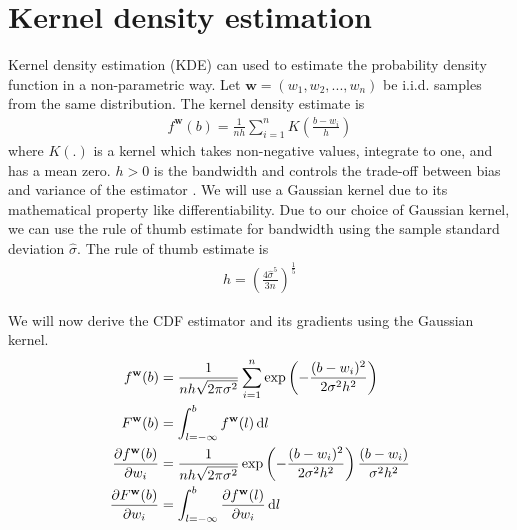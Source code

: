 \section{Kernel density estimation}
Kernel density estimation (KDE) can used to estimate the probability density function in a non-parametric way. Let $ \mathbf{w} = \left( w_1, w_2, ..., w_n\right)$ be i.i.d. samples from the same distribution. The kernel density estimate is
\begin{align}
    f^\mathbf{w} (b) = \frac{1}{nh} \sum_{i=1}^{n} K\left(\frac{b-w_i}{h}\right) \label{eqn:kde}
\end{align}
where $K(.)$ is a kernel which takes non-negative values, integrate to one, and has a mean zero. $h > 0$ is the bandwidth and controls the trade-off between bias and variance of the estimator . We will use a Gaussian kernel due to its mathematical property like differentiability. Due to our choice of Gaussian kernel, we can use the rule of thumb estimate \cite{silverman1986density} for bandwidth using the sample standard deviation $\hat{\sigma}$. The rule of thumb estimate is
\begin{align}
    h = \left( \frac{4 \hat{\sigma}^5}{3n}\right)^{\frac{1}{5}} \label{eqn:kdebw}
\end{align}

We will now derive the CDF estimator and its gradients using the Gaussian kernel.
\begin{align}
    f^\mathbf{w} (b) &= \frac{1}{nh \sqrt{2 \pi \sigma^2}} \sum_{i=1}^{n} \exp \left( -\frac{(b-w_i)^2} {2 \sigma^2 h^2}\right) \\
    F^\mathbf{w} (b) &= \int_{l=-\infty}^{b} f^\mathbf{w} (l) \mathop{}\!\mathrm{d} l \label{eqn:kdecdf} \\
    \frac{\partial f^\mathbf{w} (b)}{\partial w_i} &=  \frac{1}{nh \sqrt{2 \pi \sigma^2}} \exp \left( -\frac{(b-w_i)^2} {2 \sigma^2 h^2}\right) \frac{ \left( b - w_i \right) }{ \sigma^2 h^2} \\
    \frac{\partial F^\mathbf{w} (b)} {\partial w_i} &= \int
    _{l=-\infty}^{b} \frac{\partial f^\mathbf{w} (l)}{\partial w_i} \mathop{}\!\mathrm{d} l
\end{align}

